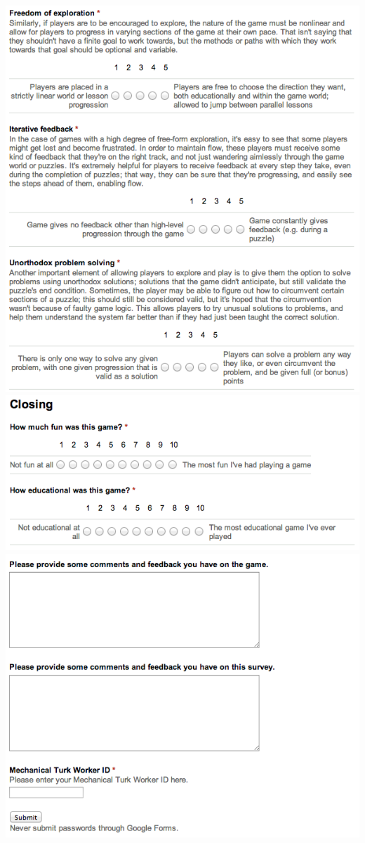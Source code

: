 		\includegraphics[width = \textwidth]{img/survey9.png}
		\includegraphics[width = \textwidth]{img/survey10.png}
		\includegraphics[width = \textwidth]{img/survey11.png}
